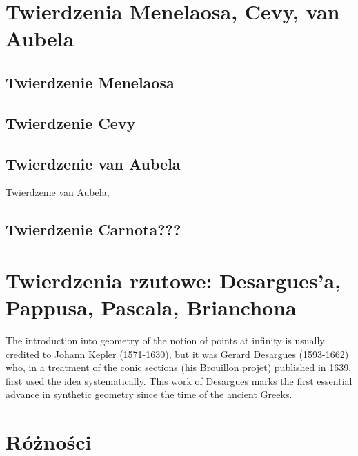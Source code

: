 
%

\section{Twierdzenia Menelaosa, Cevy, van Aubela}
\subsection{Twierdzenie Menelaosa}

\subsection{Twierdzenie Cevy}
 

\subsection{Twierdzenie van Aubela}
Twierdzenie van Aubela, 


\subsection{Twierdzenie Carnota???}


\section{Twierdzenia rzutowe: Desargues'a, Pappusa, Pascala, Brianchona}




The introduction into geometry of the notion of points at infinity is usually credited to Johann Kepler (1571-1630), but it was Gerard
Desargues (1593-1662) who, in a treatment of the conic sections
(his Brouillon projet) published in 1639, first used the idea systematically. This work of Desargues marks the first essential advance in synthetic geometry since the time of the ancient Greeks.

\section{Różności}



%